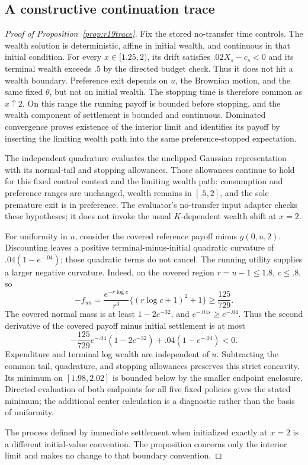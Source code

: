 \subsection{A constructive continuation trace}
\begin{proof}[Proof of Proposition~\ref{prop:r19trace}]
Fix the stored no-transfer time controls. The wealth solution is deterministic, affine in initial wealth, and continuous in that initial condition. For every $x\in[1.25,2)$, its drift satisfies $.02X_s-c_s<0$ and its terminal wealth exceeds $.5$ by the directed budget check. Thus it does not hit a wealth boundary. Preference exit depends on $u$, the Brownian motion, and the same fixed $\theta$, but not on initial wealth. The stopping time is therefore common as $x\uparrow2$. On this range the running payoff is bounded before stopping, and the wealth component of settlement is bounded and continuous. Dominated convergence proves existence of the interior limit and identifies its payoff by inserting the limiting wealth path into the same preference-stopped expectation.

The independent quadrature evaluates the unclipped Gaussian representation with its normal-tail and stopping allowances. Those allowances continue to hold for this fixed control context and the limiting wealth path: consumption and preference ranges are unchanged, wealth remains in $[.5,2]$, and the sole premature exit is in preference. The evaluator's no-transfer input adapter checks these hypotheses; it does not invoke the usual $K$-dependent wealth shift at $x=2$.

For uniformity in $u$, consider the covered reference payoff minus $g(0,u,2)$. Discounting leaves a positive terminal-minus-initial quadratic curvature of $.04(1-e^{-.04})$; those quadratic terms do not cancel. The running utility supplies a larger negative curvature. Indeed, on the covered region $r=u-1\leq1.8$, $c\leq.8$, so
\[
 -f_{uu}=\frac{e^{-r\log c}}{r^3}\{(r\log c+1)^2+1\}
 \geq\frac{125}{729}.
\]
The covered normal mass is at least $1-2e^{-32}$, and $e^{-.04s}\geq e^{-.04}$. Thus the second derivative of the covered payoff minus initial settlement is at most
\[
 -\frac{125}{729}e^{-.04}(1-2e^{-32})
       +.04(1-e^{-.04})<0.
\]
Expenditure and terminal log wealth are independent of $u$. Subtracting the common tail, quadrature, and stopping allowances preserves this strict concavity. Its minimum on $[1.98,2.02]$ is bounded below by the smaller endpoint enclosure. Directed evaluation of both endpoints for all five fixed policies gives the stated minimum; the additional center calculation is a diagnostic rather than the basis of uniformity.

The process defined by immediate settlement when initialized exactly at $x=2$ is a different initial-value convention. The proposition concerns only the interior limit and makes no change to that boundary convention.
\end{proof}

